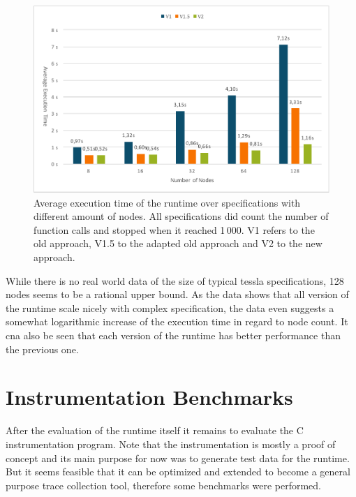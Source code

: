 \begin{figure}
  \includegraphics[width=\textwidth]{gfx/runtime_num_nodes_benchmark}
  \caption[Average execution time of the runtime over specifications with different amount of nodes.]{Average execution time of the runtime over specifications with different amount of nodes. All specifications did count the number of function calls and stopped when it reached 1\,000. V1 refers to the old approach, V1.5 to the adapted old approach and V2 to the new approach.}
\label{fig:chap_eval:runtime_num_nodes}
\end{figure}

While there is no real world data of the size of typical \gls{tessla} specifications, 128 nodes seems to be a rational upper bound.
As the data shows that all version of the runtime scale nicely with complex specification, the data even suggests a somewhat logarithmic increase of the execution time in regard to node count.
It cna also be seen that each version of the runtime has better performance than the previous one.

\clearpage

\section{Instrumentation Benchmarks}
\label{sec:evaluation:instrumentation_benchmarks}

After the evaluation of the runtime itself it remains to evaluate the C instrumentation program.
Note that the instrumentation is mostly a proof of concept and its main purpose for now was to generate test data for the runtime.
But it seems feasible that it can be optimized and extended to become a general purpose trace collection tool, therefore some benchmarks were performed.

